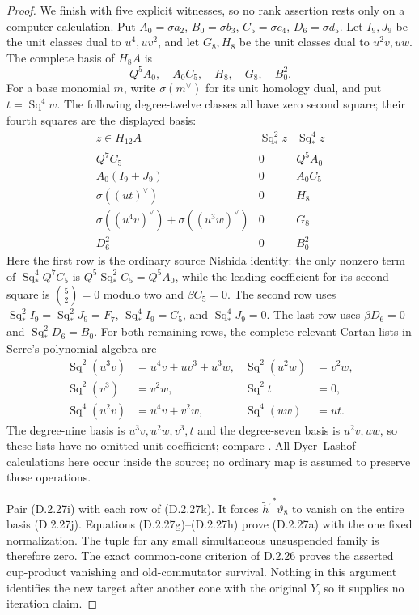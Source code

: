 \begin{proof}
We finish with five explicit witnesses, so no rank assertion
rests only on a computer calculation. Put
$A_0=\sigma a_2$, $B_0=\sigma b_3$, $C_5=\sigma c_4$,
$D_6=\sigma d_5$. Let $I_9,J_9$ be the unit classes dual
to $u^4,uv^2$, and let $G_8,H_8$ be the unit classes dual
to $u^2v,uw$. The complete basis of $H_8A$ is
\[
 Q^5A_0,\quad A_0C_5,\quad H_8,\quad G_8,\quad B_0^2.
 \tag{D.2.27j}
\]
For a base monomial $m$, write $\sigma(m^\vee)$ for its
unit homology dual, and put $t=\operatorname{Sq}^4w$.
The following degree-twelve classes all have zero second
square; their fourth squares are the displayed basis:
\[
\begin{array}{c|c|c}
 z\in H_{12}A&\operatorname{Sq}_*^2z&\operatorname{Sq}_*^4z\\ \hline
 Q^7C_5&0&Q^5A_0\\
 A_0(I_9+J_9)&0&A_0C_5\\
 \sigma((ut)^\vee)&0&H_8\\
 \sigma((u^4v)^\vee)+\sigma((u^3w)^\vee)&0&G_8\\
 D_6^2&0&B_0^2
\end{array}
 \tag{D.2.27k}
\]
Here the first row is the ordinary source Nishida identity:
the only nonzero term of $\operatorname{Sq}_*^4Q^7C_5$
is $Q^5\operatorname{Sq}_*^2C_5=Q^5A_0$, while the
leading coefficient for its second square is
$\binom52=0$ modulo two and $\beta C_5=0$.
The second row uses
$\operatorname{Sq}_*^2I_9=\operatorname{Sq}_*^2J_9=F_7$,
$\operatorname{Sq}_*^4I_9=C_5$, and
$\operatorname{Sq}_*^4J_9=0$.
The last row uses $\beta D_6=0$ and
$\operatorname{Sq}_*^2D_6=B_0$.
For both remaining rows, the complete relevant Cartan lists
in Serre's polynomial algebra are
\[
\begin{aligned}
 \operatorname{Sq}^2(u^3v)&=u^4v+uv^3+u^3w,&
 \operatorname{Sq}^2(u^2w)&=v^2w,\\
 \operatorname{Sq}^2(v^3)&=v^2w,&
 \operatorname{Sq}^2t&=0,\\
 \operatorname{Sq}^4(u^2v)&=u^4v+v^2w,&
 \operatorname{Sq}^4(uw)&=ut.
\end{aligned}
 \tag{D.2.27l}
\]
The degree-nine basis is $u^3v,u^2w,v^3,t$ and the
degree-seven basis is $u^2v,uw$, so these lists have no
omitted unit coefficient; compare
\cite[\S2, nos.~8--9]{I_Serre1953}.
All Dyer--Lashof calculations here occur inside the source;
no ordinary map is assumed to preserve those operations.

Pair \textup{(D.2.27i)} with each row of
\textup{(D.2.27k)}. It forces
$\widetilde h^{,*}\vartheta_8$ to vanish on the entire
basis \textup{(D.2.27j)}. Equations
\textup{(D.2.27g)--(D.2.27h)} prove
\textup{(D.2.27a)} with the one fixed normalization.
The tuple for any small simultaneous unsuspended family
is therefore zero. The exact common-cone criterion of
\textup{D.2.26} proves the asserted cup-product vanishing
and old-commutator survival. Nothing in this argument
identifies the new target after another cone with the
original $Y$, so it supplies no iteration claim.
\end{proof}
